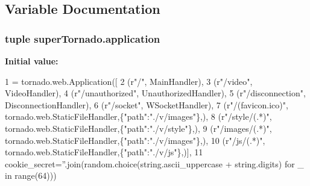 \subsection{Variable Documentation}
\hypertarget{namespacesuper_tornado_a8fda9ce7efd1de41c7487a207de2f71d}{
\subsubsection[{application}]{\setlength{\rightskip}{0pt plus 5cm}tuple super\-Tornado.\-application}}\label{namespacesuper_tornado_a8fda9ce7efd1de41c7487a207de2f71d}
{\bfseries Initial value\-:}
\begin{DoxyCode}
1 = tornado.web.Application([
2     (\textcolor{stringliteral}{r"/"}, MainHandler),
3     (\textcolor{stringliteral}{r"/video"}, VideoHandler),
4     (\textcolor{stringliteral}{r"/unauthorized"}, UnauthorizedHandler),
5     (\textcolor{stringliteral}{r"/disconnection"}, DisconnectionHandler),
6     (\textcolor{stringliteral}{r"/socket"}, WSocketHandler),
7     (\textcolor{stringliteral}{r"/(favicon.ico)"}, tornado.web.StaticFileHandler,\{\textcolor{stringliteral}{"path"}:\textcolor{stringliteral}{"./v/images"}\},),
8     (\textcolor{stringliteral}{r"/style/(.*)"}, tornado.web.StaticFileHandler,\{\textcolor{stringliteral}{"path"}:\textcolor{stringliteral}{"./v/style"}\},),
9     (\textcolor{stringliteral}{r"/images/(.*)"}, tornado.web.StaticFileHandler,\{\textcolor{stringliteral}{"path"}:\textcolor{stringliteral}{"./v/images"}\},),
10     (\textcolor{stringliteral}{r"/js/(.*)"}, tornado.web.StaticFileHandler,\{\textcolor{stringliteral}{"path"}:\textcolor{stringliteral}{"./v/js"}\},)],
11     cookie\_secret=\textcolor{stringliteral}{''}.join(random.choice(string.ascii\_uppercase + string.digits) \textcolor{keywordflow}{for} \_ \textcolor{keywordflow}{in} range(64)))
\end{DoxyCode}
